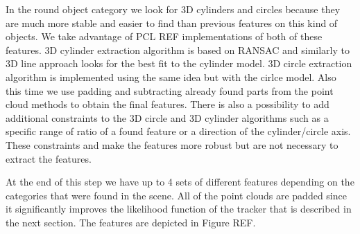 In the round object category we look for 3D cylinders and circles because they are much more stable and easier to find than previous features on this kind of objects. We take advantage of PCL REF implementations of both of these features. 3D cylinder extraction algorithm is based on RANSAC and similarly to 3D line approach looks for the best fit to the cylinder model. 3D circle extraction algorithm is implemented using the same idea but with the cirlce model. Also this time we use padding and subtracting already found parts from the point cloud methods to obtain the final features. There is also a possibility to add additional constraints to the 3D circle and 3D cylinder algorithms such as a specific range of ratio of a found feature or a direction of the cylinder/circle axis. These constraints and make the features more robust but are not necessary to extract the features. 

At the end of this step we have up to 4 sets of different features depending on the categories that were found in the scene. All of the point clouds are padded since it significantly improves the likelihood function of the tracker that is described in the next section. The features are depicted in Figure REF. 








